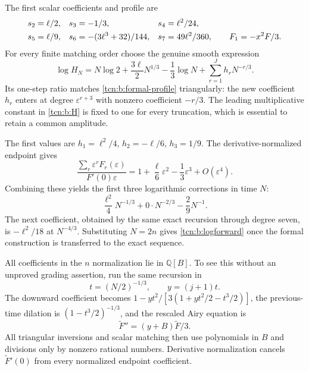 \documentclass[11pt,letterpaper]{article}
\newcommand{\eps}{\varepsilon}
\newcommand{\Q}{\mathbb Q}
\theoremstyle{remark}
\begin{document}
The first scalar coefficients and profile are
\begin{align}
 s_2&=\ell/2,&s_3&=-1/3,&s_4&=\ell^2/24,\notag\\
 s_5&=\ell/9,&s_6&=-(3\ell^3+32)/144,&s_7&=49\ell^2/360,
 \qquad F_1=-x^2F/3.                                    \label{tcn:b:s-coeffs}
\end{align}
For every finite matching order choose the genuine smooth expression
\begin{equation}
 \log H_N=N\log2+\frac{3\ell}2N^{1/3}-\frac13\log N
                    +\sum_{r=1}^J h_rN^{-r/3}.            \label{tcn:b:H}
\end{equation}
Its one-step ratio matches \eqref{tcn:b:formal-profile} triangularly: the new coefficient $h_r$ enters at degree $\eps^{r+3}$ with nonzero coefficient $-r/3$. The leading multiplicative constant in \eqref{tcn:b:H} is fixed to one for every truncation, which is essential to retain a common amplitude.

The first values are $h_1=\ell^2/4$, $h_2=-\ell/6$, $h_3=1/9$. The derivative-normalized endpoint gives
\[
 \frac{\sum_r\eps^rF_r(\eps)}{F'(0)\eps}
       =1+\frac\ell6\eps^2-\frac13\eps^3+O(\eps^4).
\]
Combining these yields the first three logarithmic corrections in time $N$:
\[
 \frac{\ell^2}4N^{-1/3}+0\cdot N^{-2/3}-\frac29N^{-1}.
\]
The next coefficient, obtained by the same exact recursion through degree seven, is $-\ell^2/18$ at $N^{-4/3}$. Substituting $N=2n$ gives \eqref{tcn:b:logforward} once the formal construction is transferred to the exact sequence.

All coefficients in the $n$ normalization lie in $\Q[B]$. To see this without an unproved grading assertion, run the same recursion in
\[
 t=(N/2)^{-1/3},\qquad y=(j+1)t.
\]
The downward coefficient becomes $1-yt^2/[3(1+yt^2/2-t^3/2)]$, the previous-time dilation is $(1-t^3/2)^{-1/3}$, and the rescaled Airy equation is
\[
 \widetilde F''=(y+B)\widetilde F/3.
\]
All triangular inversions and scalar matching then use polynomials in $B$ and divisions only by nonzero rational numbers. Derivative normalization cancels $\widetilde F'(0)$ from every normalized endpoint coefficient.
\end{document}
